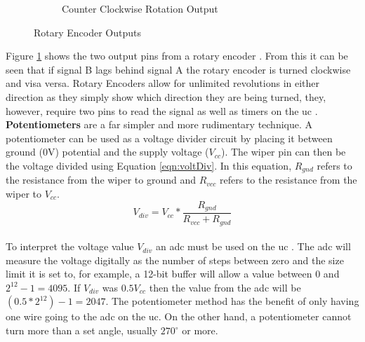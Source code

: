 \documentclass[12pt,a4paper]{report}
\begin{document}
\begin{figure}[h!]
\begin{subfigure}[b]{0.48\textwidth}
		\caption{Counter Clockwise Rotation Output}
	\end{subfigure}
	\caption{Rotary Encoder Outputs \cite{rotEnc}}
	\label{fig:rotenc}
\end{figure}
Figure \ref{fig:rotenc} shows the two output pins from a rotary encoder \cite{rotEnc}. From this it can be seen that if signal B lags behind signal A the rotary encoder is turned clockwise and visa versa. Rotary Encoders allow for unlimited revolutions in either direction as they simply show which direction they are being turned, they, however, require two pins to read the signal as well as timers on the \ac{uc} \cite{rotEnc}.\\
\textbf{Potentiometers} are a far simpler and more rudimentary technique. A potentiometer can be used as a voltage divider circuit by placing it between ground (0V) potential and the supply voltage ($V_{cc}$). The wiper pin can then be the voltage divided using Equation \ref{eqn:voltDiv}. In this equation, $R_{gnd}$ refers to the resistance from the wiper to ground and $R_{vcc}$ refers to the resistance from the wiper to $V_{cc}$.
\begin{equation} \label{eqn:voltDiv}
	V_{div} = V_{cc} * \frac{R_{gnd}}{R_{vcc} + R_{gnd}}
\end{equation}\\
To interpret the voltage value $V_{div}$ an \ac{adc} must be used on the \ac{uc} \cite{f411}. The \ac{adc} will measure the voltage digitally as the number of steps between zero and the size limit it is set to, for example, a 12-bit buffer will allow a value between 0 and $2^{12}-1 = 4095$. If $V_{div}$ was $0.5 V_{cc}$ then the value from the \ac{adc} will be $(0.5 * 2^{12})-1 = 2047$. The potentiometer method has the benefit of only having one wire going to the \ac{adc} on the \ac{uc}. On the other hand, a potentiometer cannot turn more than a set angle, usually $270^\circ$ or more.
\newpage
\end{document}
